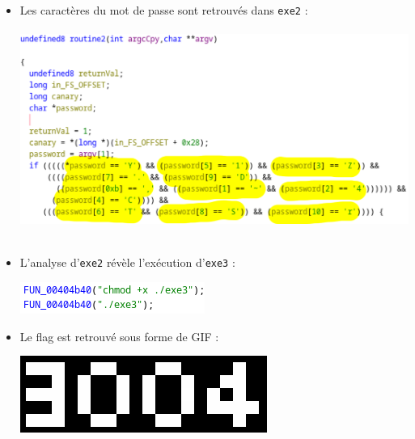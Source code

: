 \documentclass[12pt]{article}
\begin{document}
\begin{itemize}
  \item Les caractères du mot de passe sont retrouvés dans \texttt{exe2} : \\
  \\
  \includegraphics[scale=0.5]{"./2.png"}\\
\\
  \item L'analyse d'\texttt{exe2} révèle l'exécution d'\texttt{exe3} :
  \begin{center}
  \includegraphics{"./3.png"}\\
\end{center}
  \item Le flag est retrouvé sous forme de GIF : 
  \begin{center}
  \includegraphics{"./4.png"}
\end{center}
\end{itemize}
\end{document}
